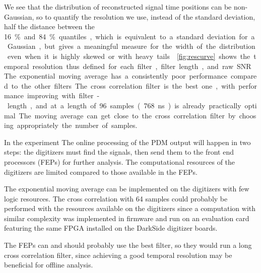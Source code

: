 We see that the distribution of reconstructed signal time positions can be
non-Gaussian, so to quantify the resolution we use, instead of the standard
deviation, half the distance between the \SI{16}\% and \SI{84}\% quantiles,
which is equivalent to a standard deviation for a Gaussian, but gives a
meaningful measure for the width of the distribution even when it is highly
skewed or with heavy tails.


\autoref{fig:rescurve} shows the temporal resolution thus defined for each
filter, filter length, and raw SNR. The exponential moving average has a
consistently poor performance compared to the other filters. The cross
correlation filter is the best one, with performance improving with
filter-length, and at a length of 96 samples (\SI{768}{ns}) is already
practically optimal. The moving average can get close to the cross correlation
filter by choosing appropriately the number of samples.

\begin{figure}
    
    

\end{figure}

In the experiment The online processing of the PDM output will happen in two
steps: the digitizers must find the signals, then send them to the front end
processors (FEPs) for further analysis. The computational resources of the
digitizers are limited compared to those available in the FEPs.

The exponential moving average can be implemented on the digitizers with few
logic resources. The cross correlation with 64 samples could probably be
performed with the resources available on the digitizers since a computation
with similar complexity was implemented in firmware and run on an evaluation
card featuring the same FPGA installed on the DarkSide digitizer boards.

The FEPs can and should probably use the best filter, so they would run a long
cross correlation filter, since achieving a good temporal resolution may be
beneficial for offline analysis.

